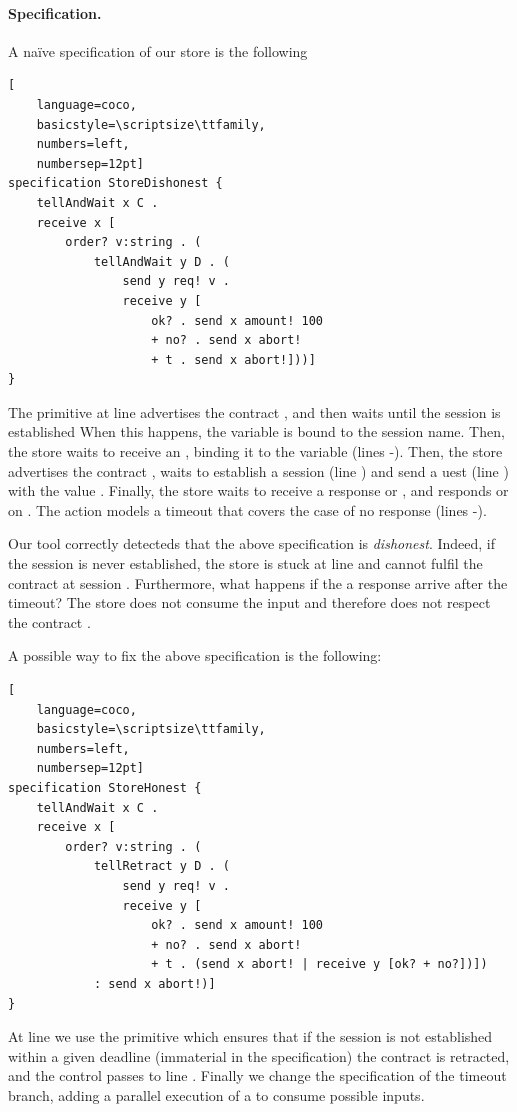 \paragraph{Specification.}
A naïve \coco specification of our store is the following
\begin{lstlisting}[
    language=coco,
    basicstyle=\scriptsize\ttfamily,
    numbers=left,
    numbersep=12pt]
specification StoreDishonest {
    tellAndWait x C .
    receive x [
        order? v:string . (
            tellAndWait y D . (
                send y req! v .
                receive y [
                    ok? . send x amount! 100
                    + no? . send x abort!
                    + t . send x abort!]))]
}
\end{lstlisting}

The primitive  at line 
advertises the contract ,
and then waits until the session is established
When this happens, the variable  is bound to the session name.
Then, the store waits to receive an , 
binding it to the variable  (lines -).
Then, the store advertises the contract , waits to establish a session
 (line ) and send a uest (line ) with
the value .
Finally, the store waits to receive a response  or ,
and responds  or  on . 
The action  models a timeout 
that covers the case of no response (lines -).

Our tool correctly detecteds that the above specification is \emph{dishonest}.
Indeed, if the session 
is never established, 
the store is stuck at line  
and cannot fulfil the contract  at session .
Furthermore, what happens if the a response arrive after the timeout?
The store does not consume the input and 
therefore does not respect the contract .

A possible way to fix the above specification is the following:
\begin{lstlisting}[
    language=coco,
    basicstyle=\scriptsize\ttfamily,
    numbers=left,
    numbersep=12pt]
specification StoreHonest {
    tellAndWait x C .
    receive x [
        order? v:string . (
            tellRetract y D . (
                send y req! v .
                receive y [
                    ok? . send x amount! 100
                    + no? . send x abort!
                    + t . (send x abort! | receive y [ok? + no?])]) 
            : send x abort!)]
}
\end{lstlisting}
At line  we use the primitive 
which ensures that if the session  is not established
within a given deadline (immaterial in the specification)
the contract  is retracted,
and the control passes to line .
Finally we change the specification of the timeout branch,
adding a parallel execution of a 
to consume possible inputs.

